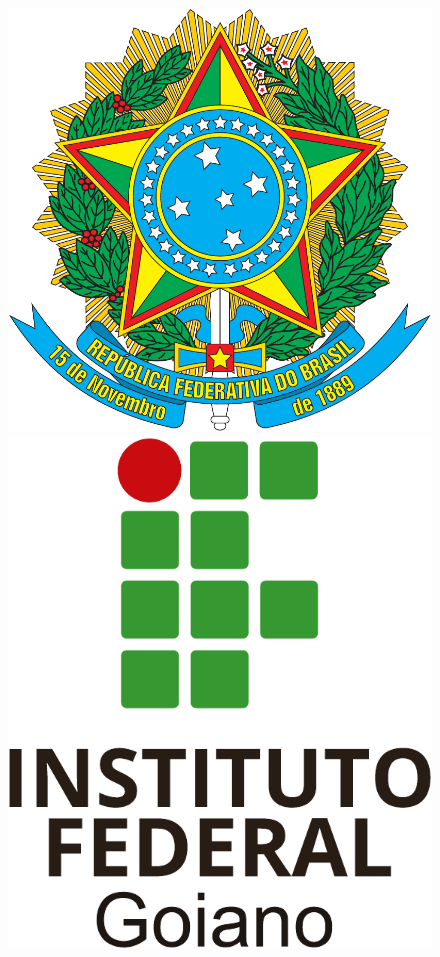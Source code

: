 \documentclass[chapter=TITLE,12pt,oneside,a4paper,english,french,sumario=tradicional,spanish,brazil,]{abntex2}
\begin{document}
\thispagestyle{empty}
\begin{figure}[t]\centering
    \begin{minipage}[t]{0.13\linewidth}
        \includegraphics[width=\linewidth]{logobr.pdf}
    \end{minipage}
        \hfill
    \begin{minipage}[t]{0.11\linewidth}
        \includegraphics[width=\linewidth]{logoif.pdf}
    \end{minipage}
\end{figure}
\end{document}
